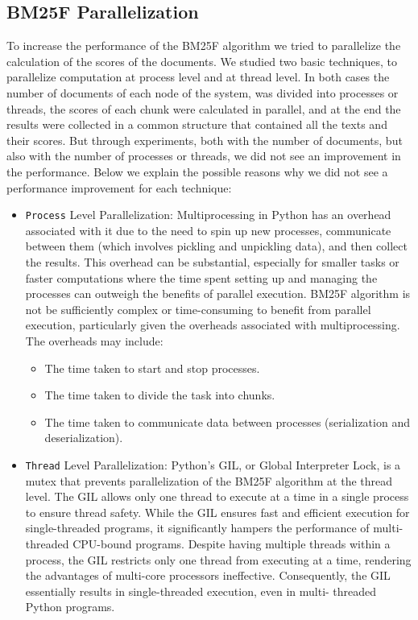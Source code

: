 \documentclass{article}
\begin{document}
\subsection{BM25F Parallelization}
To increase the performance of the BM25F algorithm we tried to parallelize the calculation of the 
scores of the documents. We studied two basic techniques, to parallelize computation at process 
level and at thread level. In both cases the number of documents of each node of the system, was 
divided into processes or threads, the scores of each chunk were calculated in parallel, and at 
the end the results were collected in a common structure that contained all the texts and their 
scores. But through experiments, both with the number of documents, but also with the number of 
processes or threads, we did not see an improvement in the performance. Below we explain the 
possible reasons why we did not see a performance improvement for each technique:

\begin{itemize}
    \item {\texttt{Process} Level Parallelization}: Multiprocessing in Python has an overhead 
    associated with it due to the need to spin up new processes, communicate between them 
    (which involves pickling and unpickling data), and then collect the results. This overhead 
    can be substantial, especially for smaller tasks or faster computations where the time 
    spent setting up and managing the processes can outweigh the benefits of parallel execution.
    BM25F algorithm is not be sufficiently complex or time-consuming to benefit from parallel 
    execution, particularly given the overheads associated with multiprocessing. The overheads 
    may include:

    \begin{itemize}
        \item The time taken to start and stop processes.
        \item The time taken to divide the task into chunks.
        \item The time taken to communicate data between processes (serialization and deserialization).
    \end{itemize}

    \item {\texttt{Thread} Level Parallelization}: Python's GIL, or Global Interpreter Lock, 
    is a mutex that prevents parallelization of the BM25F algorithm at the thread level. The 
    GIL allows only one thread to execute at a time in a single process to ensure thread 
    safety. While the GIL ensures fast and efficient execution for single-threaded programs,
     it significantly hampers the performance of multi-threaded CPU-bound programs. Despite 
     having multiple threads within a process, the GIL restricts only one thread from 
     executing at a time, rendering the advantages of multi-core processors ineffective. 
     Consequently, the GIL essentially results in single-threaded execution, even in multi-
     threaded Python programs.
\end{itemize}
\end{document}
